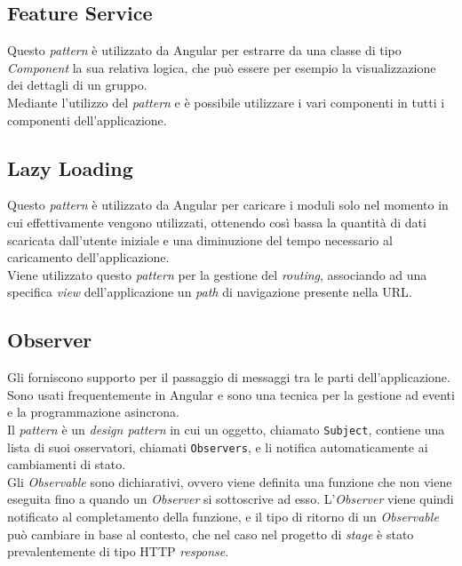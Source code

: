 \subsection{Feature Service}
Questo \textit{pattern} è utilizzato da Angular per estrarre da una classe di
tipo \textit{Component} la sua relativa logica, che può essere per esempio la
visualizzazione dei dettagli di un gruppo.\\
Mediante l'utilizzo del \textit{pattern}  e
 è possibile utilizzare i vari componenti in
tutti i componenti dell'applicazione. \cite{site-feature-modules}
\subsection{Lazy Loading}
Questo \textit{pattern} è utilizzato da Angular per caricare i moduli solo nel
momento in cui effettivamente vengono utilizzati, ottenendo così bassa la
quantità di dati scaricata dall'utente iniziale e una diminuzione del tempo
necessario al caricamento dell'applicazione.\\
Viene utilizzato questo \textit{pattern} per la gestione del \textit{routing},
associando ad una specifica \textit{view} dell'applicazione un \textit{path} di
navigazione presente nella \gls{URL}.\cite{site-lazy-loading}



\subsection{Observer}
Gli  forniscono supporto per il passaggio di messaggi tra le
parti dell'applicazione. Sono usati frequentemente in Angular e sono una
tecnica per la gestione ad eventi e la programmazione asincrona.\\
Il \textit{pattern}  è un \textit{design pattern} in cui un
oggetto, chiamato \texttt{Subject}, contiene una lista di suoi osservatori,
chiamati \texttt{Observers}, e li notifica automaticamente ai cambiamenti di
stato.\\
Gli \textit{Observable} sono dichiarativi, ovvero viene definita una funzione
che non viene eseguita fino a quando un \textit{Observer} si sottoscrive ad
esso. L'\textit{Observer} viene quindi notificato al completamento della
funzione, e il tipo di ritorno di un \textit{Observable} può cambiare in base
al contesto, che nel caso nel progetto di \textit{stage} è stato
prevalentemente di tipo HTTP \textit{response}. \cite{site-observable}\\

